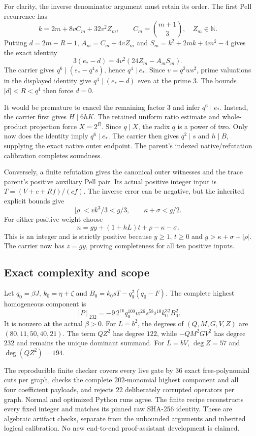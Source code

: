 \documentclass[11pt]{article}
\begin{document}
For clarity, the inverse denominator argument must retain its order.
The first Pell recurrence has
\[
 k=2m+8vC_m+32v^2Z_m,\qquad
 C_m=\binom{m+1}{3},\quad Z_m\in\mathbb N.
\]
Putting $d=2m-R-1$, $A_m=C_m+4vZ_m$ and
$S_m=k^2+2mk+4m^2-4$ gives the exact identity
\[
 3(e_*-d)=4v^2(24Z_m-A_mS_m).
\]
The carrier gives $q^6\mid(e_*-q^4s)$, hence $q^4\mid e_*$.
Since $v=q^3ws^2$, prime valuations in the displayed identity give
$q^4\mid(e_*-d)$ even at the prime $3$.
The bounds $|d|<R<q^4$ then force $d=0$.

It would be premature to cancel the remaining factor $3$ and infer
$q^6\mid e_*$.  Instead, the carrier first gives $H\mid6hK$.
The retained uniform ratio estimate and whole-product projection force
$X=2^R$.  Since $q\mid X$, the radix $q$ is a power of two.  Only now
does the identity imply $q^6\mid e_*$.  The carrier then gives
$q^2\mid s$ and $h\mid B$, supplying the exact native outer endpoint.
The parent's indexed native/refutation calibration completes soundness.

Conversely, a finite refutation gives the canonical outer witnesses and
the trace parent's positive auxiliary Pell pair.  Its actual positive
integer input is $T=(V+c+Rf)/(cf)$.
The inverse error can be negative, but the inherited explicit bounds give
\[
 |\rho|<vk^3/3<g/3,\qquad \kappa+\sigma<g/2.
\]
For either positive weight choose
\[
 n=gy+(1+hL)t+\rho-\kappa-\sigma.
\]
This is an integer and is strictly positive because $y\ge1$, $t\ge0$
and $g>\kappa+\sigma+|\rho|$.  The carrier now has $z=gy$, proving
completeness for all ten positive inputs.

\subsection{Exact complexity and scope}

Let $q_0=\beta J$, $k_0=\eta+\zeta$ and
$B_0=k_0sT-q_0^2(q_0-F)$.  The complete highest homogeneous component is
\[
 [P]_{232}=-9\,2^{10}q_0^{100}w^{26}s^{58}i^{10}k_0^{32}B_0^2.
\]
It is nonzero at the actual $\beta>0$.
For $L=b^2$, the degrees of $(Q,M,G,V,Z)$ are
$(80,11,50,40,21)$.  The term $QZ^2$ has degree $122$, while
$-QM^2GV^2$ has degree $232$ and remains the unique dominant summand.
For $L=bV$, $\deg Z=57$ and $\deg(QZ^2)=194$.

The reproducible finite checker covers every live gate by $36$ exact
free-polynomial cuts per graph, checks the complete $202$-monomial highest
component and all four coefficient payloads, and rejects $22$ deliberately
corrupted operators per graph.  Normal and optimized Python runs agree.
The finite recipe reconstructs every fixed integer and matches its pinned
raw SHA-256 identity.  These are algebraic artifact checks, separate from
the unbounded arguments and inherited logical calibration.
No new end-to-end proof-assistant development is claimed.
\end{document}
